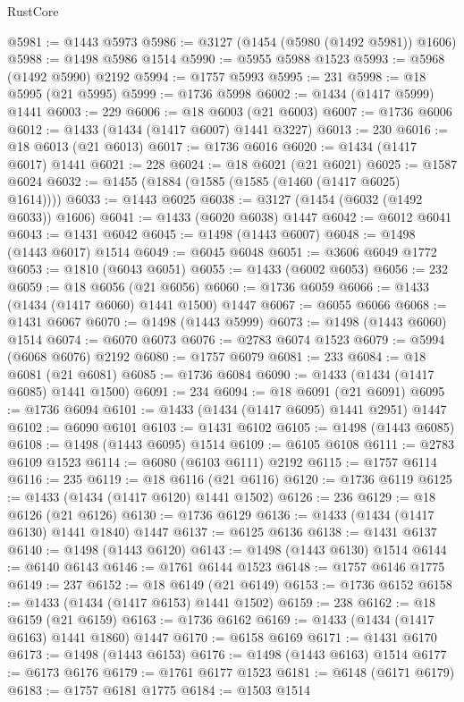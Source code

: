 \begin{lexlean}{RustCore}
\begin{coremodule}
@5981 := @1443 @5973
@5986 := @3127 (@1454 (@5980 (@1492 @5981)) @1606)
@5988 := @1498 @5986 @1514
@5990 := @5955 @5988 @1523
@5993 := @5968 (@1492 @5990) @2192
@5994 := @1757 @5993
@5995 := 231
@5998 := @18 @5995 (@21 @5995)
@5999 := @1736 @5998
@6002 := @1434 (@1417 @5999) @1441
@6003 := 229
@6006 := @18 @6003 (@21 @6003)
@6007 := @1736 @6006
@6012 := @1433 (@1434 (@1417 @6007) @1441 @3227)
@6013 := 230
@6016 := @18 @6013 (@21 @6013)
@6017 := @1736 @6016
@6020 := @1434 (@1417 @6017) @1441
@6021 := 228
@6024 := @18 @6021 (@21 @6021)
@6025 := @1587 @6024
@6032 := @1455 (@1884 (@1585 (@1585 (@1460 (@1417 @6025) @1614))))
@6033 := @1443 @6025
@6038 := @3127 (@1454 (@6032 (@1492 @6033)) @1606)
@6041 := @1433 (@6020 @6038) @1447
@6042 := @6012 @6041
@6043 := @1431 @6042
@6045 := @1498 (@1443 @6007)
@6048 := @1498 (@1443 @6017) @1514
@6049 := @6045 @6048
@6051 := @3606 @6049 @1772
@6053 := @1810 (@6043 @6051)
@6055 := @1433 (@6002 @6053)
@6056 := 232
@6059 := @18 @6056 (@21 @6056)
@6060 := @1736 @6059
@6066 := @1433 (@1434 (@1417 @6060) @1441 @1500) @1447
@6067 := @6055 @6066
@6068 := @1431 @6067
@6070 := @1498 (@1443 @5999)
@6073 := @1498 (@1443 @6060) @1514
@6074 := @6070 @6073
@6076 := @2783 @6074 @1523
@6079 := @5994 (@6068 @6076) @2192
@6080 := @1757 @6079
@6081 := 233
@6084 := @18 @6081 (@21 @6081)
@6085 := @1736 @6084
@6090 := @1433 (@1434 (@1417 @6085) @1441 @1500)
@6091 := 234
@6094 := @18 @6091 (@21 @6091)
@6095 := @1736 @6094
@6101 := @1433 (@1434 (@1417 @6095) @1441 @2951) @1447
@6102 := @6090 @6101
@6103 := @1431 @6102
@6105 := @1498 (@1443 @6085)
@6108 := @1498 (@1443 @6095) @1514
@6109 := @6105 @6108
@6111 := @2783 @6109 @1523
@6114 := @6080 (@6103 @6111) @2192
@6115 := @1757 @6114
@6116 := 235
@6119 := @18 @6116 (@21 @6116)
@6120 := @1736 @6119
@6125 := @1433 (@1434 (@1417 @6120) @1441 @1502)
@6126 := 236
@6129 := @18 @6126 (@21 @6126)
@6130 := @1736 @6129
@6136 := @1433 (@1434 (@1417 @6130) @1441 @1840) @1447
@6137 := @6125 @6136
@6138 := @1431 @6137
@6140 := @1498 (@1443 @6120)
@6143 := @1498 (@1443 @6130) @1514
@6144 := @6140 @6143
@6146 := @1761 @6144 @1523
@6148 := @1757 @6146 @1775
@6149 := 237
@6152 := @18 @6149 (@21 @6149)
@6153 := @1736 @6152
@6158 := @1433 (@1434 (@1417 @6153) @1441 @1502)
@6159 := 238
@6162 := @18 @6159 (@21 @6159)
@6163 := @1736 @6162
@6169 := @1433 (@1434 (@1417 @6163) @1441 @1860) @1447
@6170 := @6158 @6169
@6171 := @1431 @6170
@6173 := @1498 (@1443 @6153)
@6176 := @1498 (@1443 @6163) @1514
@6177 := @6173 @6176
@6179 := @1761 @6177 @1523
@6181 := @6148 (@6171 @6179)
@6183 := @1757 @6181 @1775
@6184 := @1503 @1514

\end{coremodule}
\end{lexlean}
